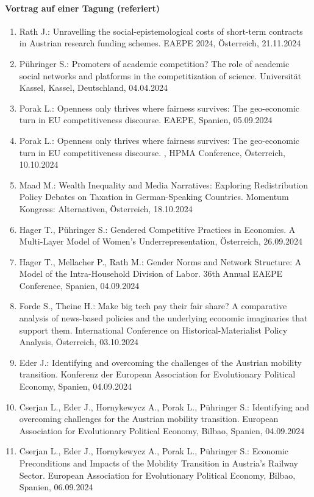 \paragraph{Vortrag auf einer Tagung (referiert)}
\begin{enumerate}
	\item Rath J.: Unravelling the social-epistemological costs of short-term contracts in Austrian research funding schemes. EAEPE 2024, Österreich, 21.11.2024
	\item Pühringer S.: Promoters of academic competition? The role of academic social networks and platforms in the competitization of science. Universität Kassel, Kassel, Deutschland, 04.04.2024
	\item Porak L.: Openness only thrives where fairness survives: The geo-economic turn in EU competitiveness discourse. EAEPE, Spanien, 05.09.2024
	\item Porak L.: Openness only thrives where fairness survives: The geo-economic turn in EU competitiveness discourse. , HPMA Conference, Österreich, 10.10.2024
	\item Maad M.: Wealth Inequality and Media Narratives: Exploring Redistribution Policy Debates on Taxation in German-Speaking Countries. Momentum Kongress: Alternativen, Österreich, 18.10.2024
	\item Hager T., Pühringer S.: Gendered Competitive Practices in Economics. A Multi-Layer Model of Women’s Underrepresentation, Österreich, 26.09.2024
	\item Hager T., Mellacher P., Rath M.: Gender Norms and Network Structure: A Model of the Intra-Household Division of Labor. 36th Annual EAEPE Conference, Spanien, 04.09.2024
	\item Forde S., Theine H.: Make big tech pay their fair share? A comparative analysis of news-based policies and the underlying economic imaginaries that support them. International Conference on Historical-Materialist Policy Analysis, Österreich, 03.10.2024
	\item Eder J.: Identifying and overcoming the challenges of the Austrian mobility transition. Konferenz der European Association for Evolutionary Political Economy, Spanien, 04.09.2024
	\item Cserjan L., Eder J., Hornykewycz A., Porak L., Pühringer S.: Identifying and overcoming challenges for the Austrian mobility transition. European Association for Evolutionary Political Economy, Bilbao, Spanien, 04.09.2024
	\item Cserjan L., Eder J., Hornykewycz A., Porak L., Pühringer S.: Economic Preconditions and Impacts of the Mobility Transition in Austria's Railway Sector. European Association for Evolutionary Political Economy, Bilbao, Spanien, 06.09.2024

\end{enumerate}
